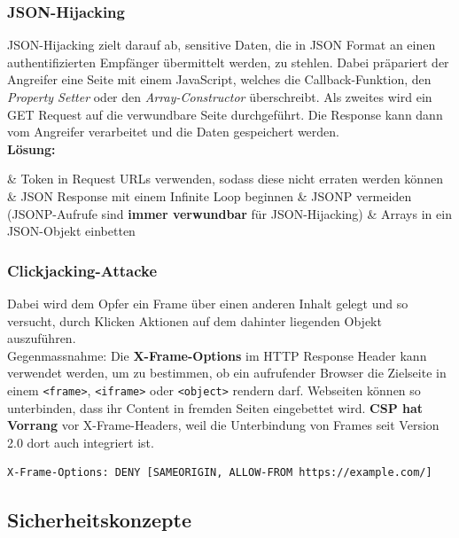 \subsubsection{JSON-Hijacking}
JSON-Hijacking zielt darauf ab, sensitive Daten, die in JSON Format an einen authentifizierten Empfänger übermittelt werden, zu stehlen. Dabei präpariert der Angreifer eine Seite mit einem JavaScript, welches die Callback-Funktion, den \textit{Property Setter} oder den \textit{Array-Constructor} überschreibt. Als zweites wird ein GET Request auf die verwundbare Seite durchgeführt. Die Response kann dann vom Angreifer verarbeitet und die Daten gespeichert werden.\\

\textbf{Lösung:}
\begin{easylist}
	& Token in Request URLs verwenden, sodass diese nicht erraten werden können
	& JSON Response mit einem Infinite Loop beginnen
	& JSONP vermeiden (JSONP-Aufrufe sind \textbf{immer verwundbar} für JSON-Hijacking)
	& Arrays in ein JSON-Objekt einbetten
\end{easylist}

\subsubsection{Clickjacking-Attacke}
Dabei wird dem Opfer ein Frame über einen anderen Inhalt gelegt und so versucht, durch Klicken Aktionen auf dem dahinter liegenden Objekt auszuführen.\\
Gegenmassnahme: Die \textbf{X-Frame-Options} im HTTP Response Header kann verwendet werden, um zu bestimmen, ob ein aufrufender Browser die Zielseite in einem \lstinline|<frame>|, \lstinline|<iframe>| oder \lstinline|<object>| rendern darf. Webseiten können so unterbinden, dass ihr Content in fremden Seiten eingebettet wird.
\textbf{CSP hat Vorrang} vor X-Frame-Headers, weil die Unterbindung von Frames seit Version 2.0 dort auch integriert ist.

\begin{lstlisting}[caption=Clickjacking mittels X-Frame-Options unterbinden, language={}]
X-Frame-Options: DENY [SAMEORIGIN, ALLOW-FROM https://example.com/]
\end{lstlisting}

\subsection{Sicherheitskonzepte}


